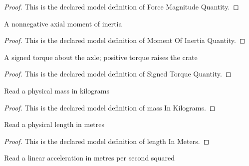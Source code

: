 \begin{proof}
  This is the declared model definition of Force Magnitude Quantity.
\end{proof}
\begin{definition}
  \label{def:physics:phyx-mini-0784:phyxminiproblems-problemphyxmini0784-momentofinertiaquantity}
  A nonnegative axial moment of inertia
\end{definition}
\begin{proof}
  This is the declared model definition of Moment Of Inertia Quantity.
\end{proof}
\begin{definition}
  \label{def:physics:phyx-mini-0784:phyxminiproblems-problemphyxmini0784-signedtorquequantity}
  A signed torque about the axle; positive torque raises the crate
\end{definition}
\begin{proof}
  This is the declared model definition of Signed Torque Quantity.
\end{proof}
\begin{definition}
  \label{def:physics:phyx-mini-0784:phyxminiproblems-problemphyxmini0784-massinkilograms}
  Read a physical mass in kilograms
\end{definition}
\begin{proof}
  This is the declared model definition of mass In Kilograms.
\end{proof}
\begin{definition}
  \label{def:physics:phyx-mini-0784:phyxminiproblems-problemphyxmini0784-lengthinmeters}
  Read a physical length in metres
\end{definition}
\begin{proof}
  This is the declared model definition of length In Meters.
\end{proof}
\begin{definition}
  \label{def:physics:phyx-mini-0784:phyxminiproblems-problemphyxmini0784-accelerationinmeterspersecondsquared}
  Read a linear acceleration in metres per second squared
\end{definition}
